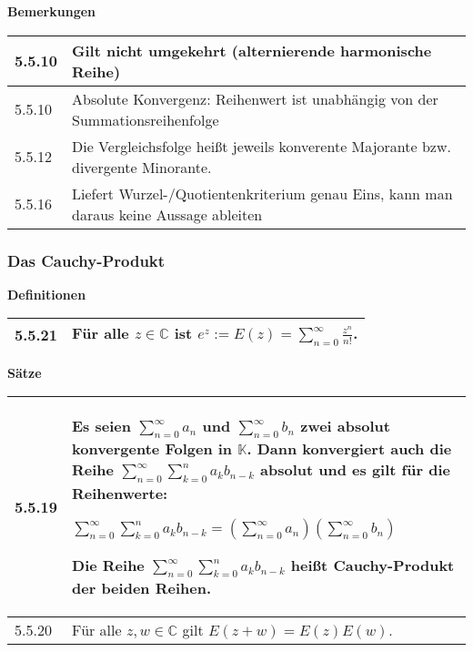 \begin{table}[H]
\begin{tabularx}{\textwidth}{X m{16cm}}
        \bottomrule
    \end{tabularx}
    \end{table}

    \noindent
    \textbf{Bemerkungen}
    \begin{table}[H]
    \begin{tabularx}{\textwidth}{X m{16cm}}
        \toprule

        5.5.10& Gilt nicht umgekehrt (alternierende harmonische Reihe)  \\
        \midrule
        5.5.10& Absolute Konvergenz: Reihenwert ist unabhängig von der Summationsreihenfolge \\
        \midrule
        5.5.12& Die Vergleichsfolge heißt jeweils konverente Majorante bzw. divergente Minorante. \\
        \midrule
        5.5.16& Liefert Wurzel-/Quotientenkriterium genau Eins, kann man daraus keine Aussage ableiten \\

        \bottomrule
    \end{tabularx}
    \end{table}

\subsubsection{Das Cauchy-Produkt}
\noindent
\textbf{Definitionen}
\begin{table}[H]  
\begin{tabularx}{\textwidth}{X m{16cm}}
    \toprule

    5.5.21& Für alle $z \in \mathbb{C}$ ist $e^z:= E(z) = \sum\limits^{\infty}_{n=0} \frac{z^n}{n!}$. \\

    \bottomrule

\end{tabularx}
\end{table}

\noindent 
\textbf{Sätze}
\begin{table}[H]
\begin{tabularx}{\textwidth}{X m{16cm}}
    \toprule

    5.5.19& Es seien $\sum^{\infty}_{n=0} a_n$ und $\sum^{\infty}_{n=0} b_n$ zwei \textbf{absolut konvergente Folgen} in $\mathbb{K}$.
            Dann konvergiert auch die Reihe $\sum^{\infty}_{n=0} \sum^{n}_{k=0} a_k b_{n-k}$ \textbf{absolut} und es gilt für
            die Reihenwerte: \hfill \break
            \centerline{$\sum\limits^{\infty}_{n=0} \sum\limits^{n}_{k=0} a_k b_{n-k} = (\sum\limits^{\infty}_{n=0} a_n) (\sum\limits^{\infty}_{n=0} b_n)$} 
            Die Reihe $\sum\limits^{\infty}_{n=0} \sum\limits^{n}_{k=0} a_k b_{n-k}$ heißt \textbf{Cauchy-Produkt} der beiden Reihen. \\
    \midrule
    5.5.20& Für alle $z,w \in \mathbb{C}$ gilt $E(z+w) = E(z)E(w)$. \\

    \bottomrule
\end{tabularx}
\end{table}

